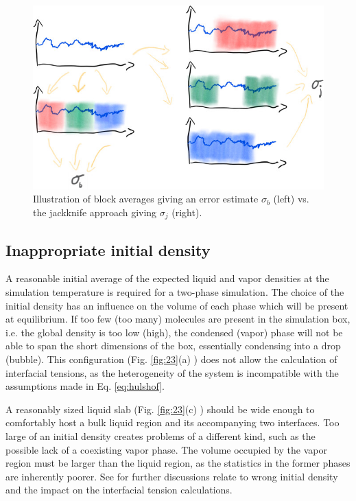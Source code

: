 \documentclass[9pt,bestpractices]{livecoms}
\begin{document}
\begin{figure}
	\centering
  \includegraphics[width=\linewidth]{gfx/fig_jackknife.jpeg}
  \caption{Illustration of block averages giving an error estimate $\sigma_b$ (left) vs. the jackknife approach giving $\sigma_j$ (right).}
\label{fig:jackknife}
\end{figure}


\subsection{Inappropriate initial density}

A reasonable initial average of the expected liquid and vapor densities at the
simulation temperature is required for a two-phase simulation. The choice of
the initial density has an influence on the volume of each phase which will be
present at equilibrium.  If too few (too many) molecules are present in the
simulation box, i.e. the global density is too low (high), the condensed
(vapor) phase will not be able to span the short dimensions of the box,
essentially condensing into a drop (bubble). This configuration (Fig.
\ref{fig:23}(a) ) does not allow the calculation of interfacial tensions, as
the heterogeneity of the system is incompatible with the assumptions made in
Eq. \ref{eq:hulshof}.

A reasonably sized liquid slab (Fig. \ref{fig:23}(c) ) should be wide enough to comfortably host a bulk liquid
region and its accompanying two interfaces. Too large of an initial density
creates problems of a different kind, such as the possible lack of a coexisting
vapor phase. The volume occupied by the vapor region must be larger than the
liquid region, as the statistics in the former phases are inherently poorer.
See \citet{holcomb1993} for further discussions relate
to wrong initial density and the impact on the interfacial tension
calculations.
\end{document}

